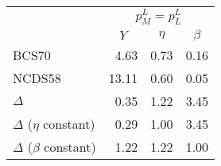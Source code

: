 
\begin{tabular}{lrrr}
\toprule
\multicolumn{1}{c}{} & \multicolumn{3}{c}{$p_{M}^{L}=p_{L}^{L}$} \\
\cmidrule(l{3pt}r{3pt}){2-4}
  & \multicolumn{1}{c}{$Y$} & \multicolumn{1}{c}{$\eta$} & \multicolumn{1}{c}{$\beta$}\\
\midrule
BCS70 & 4.63 & 0.73 & 0.16\\
NCDS58 & 13.11 & 0.60 & 0.05\\
\midrule
$\Delta$ & 0.35 & 1.22 & 3.45\\
\midrule
$\Delta$ ($\eta$ constant) & 0.29 & 1.00 & 3.45\\
$\Delta$ ($\beta$ constant) & 1.22 & 1.22 & 1.00\\
\bottomrule
\end{tabular}

